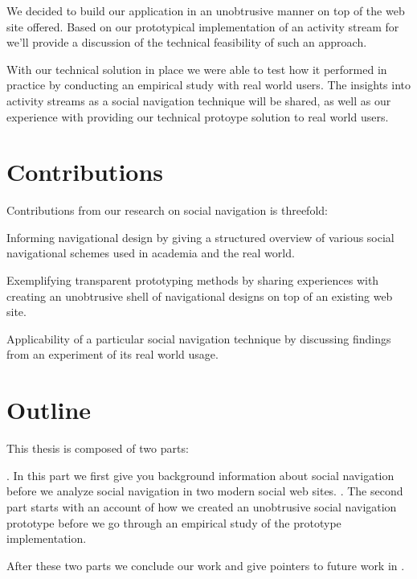 We decided to build our application in an unobtrusive manner on top of the
web site \urort{} offered.%
Based on our prototypical implementation of an activity stream for \urort{}
we'll provide a discussion of the technical feasibility of such an approach.

With our technical solution in place we were able to test how it performed in
practice by conducting an empirical study with real world users. The insights
into activity streams as a social navigation technique will be shared, as well
as our experience with providing our technical protoype solution to real world
users.

\section{Contributions}

Contributions from our research on social navigation is threefold:

\begin{enum}
  \item Informing navigational design by giving a structured overview of
    various social navigational schemes used in academia and the real world.
  \item Exemplifying transparent prototyping methods by sharing experiences
    with creating an unobtrusive shell of navigational designs on top of an
    existing web site.
  \item Applicability of a particular social navigation technique
    by discussing findings from an experiment of its real world usage.
\end{enum}

\section{Outline}

This thesis is composed of two parts:

\begin{enum}
  . In this part we first give you
    background information about social navigation before
    we analyze social navigation in two modern social web sites.
  . The second part starts
    with an account of how we created an unobtrusive social navigation
    prototype before we go through an empirical study of the prototype
    implementation.
\end{enum}

After these two parts we conclude our work and give pointers to future work
in .
